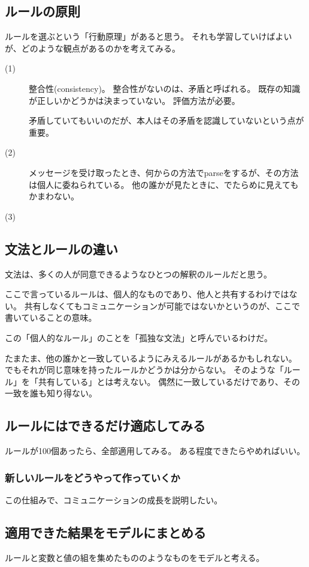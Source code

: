 \documentclass[10pt, oneside]{jarticle}   	%
\begin{document}
\subsection{ルールの原則}
ルールを選ぶという「行動原理」があると思う。
それも学習していけばよいが、どのような観点があるのかを考えてみる。
\begin{description}
\item[ (1)] 整合性(consistency)。 整合性がないのは、矛盾と呼ばれる。
既存の知識が正しいかどうかは決まっていない。
評価方法が必要。

矛盾していてもいいのだが、本人はその矛盾を認識していないという点が重要。
\item[ (2)] メッセージを受け取ったとき、何からの方法でparseをするが、その方法は個人に委ねられている。
他の誰かが見たときに、でたらめに見えてもかまわない。
\item[ (3)] 

\end{description}

\subsection{文法とルールの違い}
文法は、多くの人が同意できるようなひとつの解釈のルールだと思う。

ここで言っているルールは、個人的なものであり、他人と共有するわけではない。
共有しなくてもコミュニケーションが可能ではないかというのが、ここで書いていることの意味。

この「個人的なルール」のことを「孤独な文法」と呼んでいるわけだ。

たまたま、他の誰かと一致しているようにみえるルールがあるかもしれない。
でもそれが同じ意味を持ったルールかどうかは分からない。
そのような「ルール」を「共有している」とは考えない。
偶然に一致しているだけであり、その一致を誰も知り得ない。

\subsection{ルールにはできるだけ適応してみる}
ルールが100個あったら、全部適用してみる。
ある程度できたらやめればいい。

\subsubsection{新しいルールをどうやって作っていくか}
この仕組みで、コミュニケーションの成長を説明したい。

\subsection{適用できた結果をモデルにまとめる}
ルールと変数と値の組を集めたもののようなものをモデルと考える。
\end{document}
